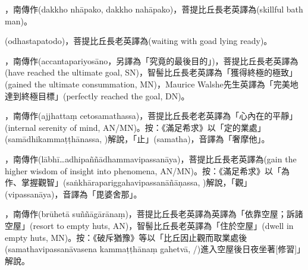 \startitemgroup[noteitems]
\item{}，南傳作(dakkho nhāpako, dakkho nahāpako)，菩提比丘長老英譯為(skillful bath man)。
\stopitemgroup

\startitemgroup[noteitems]
\item{}(odhastapatodo)，菩提比丘長老英譯為(waiting with goad lying ready)。
\stopitemgroup

\startitemgroup[noteitems]
\item{}，南傳作(accantapariyosāno，另譯為「究竟的最後目的」)，菩提比丘長老英譯為(have reached the ultimate goal, SN)，智髻比丘長老英譯為「獲得終極的極致」(gained the ultimate consummation, MN)，Maurice Walshe先生英譯為「完美地達到終極目標」(perfectly reached the goal, DN)。
\stopitemgroup

\startitemgroup[noteitems]
\item{}，南傳作(ajjhattaṃ cetosamathassa)，菩提比丘長老老英譯為「心內在的平靜」(internal serenity of mind, AN/MN)。按：《滿足希求》以「定的業處」(samādhikammaṭṭhānassa, )解說，「止」(samatha)，音譯為「奢摩他」。
\stopitemgroup

\startitemgroup[noteitems]
\item{}，南傳作(lābhī…adhipaññādhammavipassanāya)，菩提比丘長老英譯為(gain the higher wisdom of insight into phenomena, AN/MN)。按：《滿足希求》以「為作、掌握觀智」(saṅkhārapariggahavipassanāñāṇassa, )解說，「觀」(vipassanāya)，音譯為「毘婆舍那」。
\stopitemgroup

\startitemgroup[noteitems]
\item{}，南傳作(brūhetā suññāgārānaṃ)，菩提比丘長老英譯為英譯為「依靠空屋；訴諸空屋」(resort to empty huts, AN)，智髻比丘長老英譯為「住於空屋」(dwell in empty huts, MN)。按：《破斥猶豫》等以「比丘因止觀而取業處後(samathavipassanāvasena kammaṭṭhānaṃ gahetvā, /)進入空屋後日夜坐著[修習]」解說。
\stopitemgroup

